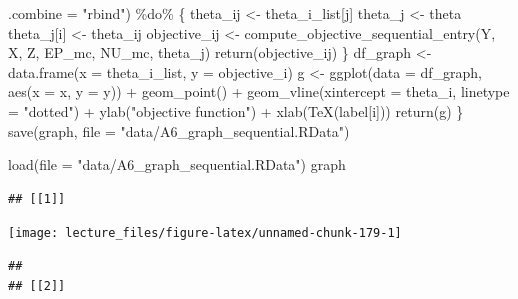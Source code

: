 \documentclass[
]{book}
\newenvironment{Shaded}{\begin{snugshade}}{\end{snugshade}}
\newcommand{\AttributeTok}[1]{\textcolor[rgb]{0.77,0.63,0.00}{#1}}
\newcommand{\FunctionTok}[1]{\textcolor[rgb]{0.00,0.00,0.00}{#1}}
\newcommand{\NormalTok}[1]{#1}
\newcommand{\OtherTok}[1]{\textcolor[rgb]{0.56,0.35,0.01}{#1}}
\newcommand{\SpecialCharTok}[1]{\textcolor[rgb]{0.00,0.00,0.00}{#1}}
\newcommand{\StringTok}[1]{\textcolor[rgb]{0.31,0.60,0.02}{#1}}
\begin{document}
\begin{Shaded}
\begin{Highlighting}[]
             \AttributeTok{.combine =} \StringTok{"rbind"}\NormalTok{) }\SpecialCharTok{\%do\%}\NormalTok{ \{}
\NormalTok{               theta\_ij }\OtherTok{\textless{}{-}}\NormalTok{ theta\_i\_list[j]}
\NormalTok{               theta\_j }\OtherTok{\textless{}{-}}\NormalTok{ theta}
\NormalTok{               theta\_j[i] }\OtherTok{\textless{}{-}}\NormalTok{ theta\_ij}
\NormalTok{               objective\_ij }\OtherTok{\textless{}{-}} 
                 \FunctionTok{compute\_objective\_sequential\_entry}\NormalTok{(Y, X, Z, EP\_mc, NU\_mc, theta\_j)}
               \FunctionTok{return}\NormalTok{(objective\_ij)}
\NormalTok{             \}}
\NormalTok{  df\_graph }\OtherTok{\textless{}{-}} \FunctionTok{data.frame}\NormalTok{(}\AttributeTok{x =}\NormalTok{ theta\_i\_list, }\AttributeTok{y =}\NormalTok{ objective\_i) }
\NormalTok{  g }\OtherTok{\textless{}{-}} \FunctionTok{ggplot}\NormalTok{(}\AttributeTok{data =}\NormalTok{ df\_graph, }\FunctionTok{aes}\NormalTok{(}\AttributeTok{x =}\NormalTok{ x, }\AttributeTok{y =}\NormalTok{ y)) }\SpecialCharTok{+} 
    \FunctionTok{geom\_point}\NormalTok{() }\SpecialCharTok{+}
    \FunctionTok{geom\_vline}\NormalTok{(}\AttributeTok{xintercept =}\NormalTok{ theta\_i, }\AttributeTok{linetype =} \StringTok{"dotted"}\NormalTok{) }\SpecialCharTok{+}
    \FunctionTok{ylab}\NormalTok{(}\StringTok{"objective function"}\NormalTok{) }\SpecialCharTok{+} \FunctionTok{xlab}\NormalTok{(}\FunctionTok{TeX}\NormalTok{(label[i]))}
  \FunctionTok{return}\NormalTok{(g)}
\NormalTok{\}}
\FunctionTok{save}\NormalTok{(graph, }\AttributeTok{file =} \StringTok{"data/A6\_graph\_sequential.RData"}\NormalTok{)}
\end{Highlighting}
\end{Shaded}

\begin{Shaded}
\begin{Highlighting}[]
\FunctionTok{load}\NormalTok{(}\AttributeTok{file =} \StringTok{"data/A6\_graph\_sequential.RData"}\NormalTok{)}
\NormalTok{graph}
\end{Highlighting}
\end{Shaded}

\begin{verbatim}
## [[1]]
\end{verbatim}

\begin{center}\texttt{[image: lecture\_files/figure-latex/unnamed-chunk-179-1]} \end{center}

\begin{verbatim}
## 
## [[2]]
\end{verbatim}
\end{document}
